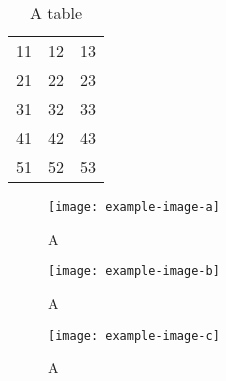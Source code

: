 \documentclass{article}
\begin{document}
\lipsum[1]

\begin{table}[htb]
\centering
\begin{tabular}{|lll|}
\hline
    11 & 12 & 13\\
    21 & 22 & 23\\
    31 & 32 & 33\\
    41 & 42 & 43\\
    51 & 52 & 53\\
\hline
\end{tabular}
\caption{A table}
\end{table}


\begin{figure}[htp]
\texttt{[image: example-image-a]}
\caption{A}\label{a}
\end{figure}

\lipsum[6-10]

\begin{figure}[htp]
\texttt{[image: example-image-b]}
\caption{A}\label{a}
\end{figure}

\begin{figure}[htp]
\texttt{[image: example-image-c]}
\caption{A}\label{a}
\end{figure}

\lipsum[16-20]
\end{document}
